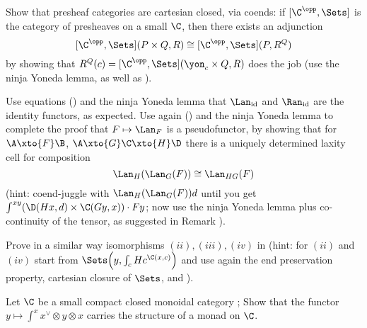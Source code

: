 \begin{exerciseset}
\begin{exercisepoints}
\item \label{closed.via.coends} Show that presheaf categories are cartesian closed, via coends: if $[\C^\opp,\Sets]$ is the category of presheaves on a small $\C$, then there exists an adjunction
\[
[\C^\opp,\Sets](P\times Q, R)\cong [\C^\opp,\Sets](P, R^Q)
\]
by showing that $R^Q(c) = [\C^\opp,\Sets](\yon_c\times Q, R)$ does the job (use the ninja Yoneda lemma, as well as \athm{}).
\item Use equations () and the ninja Yoneda lemma that $\Lan_\text{id}$ and $\Ran_\text{id}$ are the identity functors, as expected. Use again () and the ninja Yoneda lemma to complete the proof that $F\mapsto \Lan_F$ is a pseudofunctor, by showing that for $\A \xto{F}\B$, $\A\xto{G}\C\xto{H}\D$ there is a uniquely determined laxity cell for composition
\[
\Lan_H(\Lan_G(F))\cong \Lan_{HG}(F)
\]
(hint: coend-juggle with $\Lan_H(\Lan_G(F))d$ until you get $\int^{xy}(\D(Hx, d)\times \C(Gy, x))\cdot Fy$; now use the ninja Yoneda lemma plus co-continuity of the tensor, as suggested in Remark ).
\item Prove in a similar way isomorphisms $(ii), (iii), (iv)$ in \athm{} (hint: for $(ii)$ and $(iv)$ start from $\Sets\Big(y, \int_cHc^{\C(x,c)}\Big)$ and use again the end preservation property, cartesian closure of $\Sets$, and \athm{}).
\item Let $\C$ be a small compact closed monoidal category \cite{MR0470024}; Show that the functor $y\mapsto \int^x x^\lor \otimes y \otimes x$ carries the structure of a monad on $\C$.
\end{exercisepoints}
\end{exerciseset}